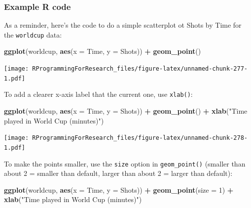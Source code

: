 \documentclass[]{book}
\makeatletter
\newenvironment{Shaded}{\begin{snugshade}}{\end{snugshade}}
\newcommand{\KeywordTok}[1]{\textcolor[rgb]{0.13,0.29,0.53}{\textbf{#1}}}
\newcommand{\DataTypeTok}[1]{\textcolor[rgb]{0.13,0.29,0.53}{#1}}
\newcommand{\DecValTok}[1]{\textcolor[rgb]{0.00,0.00,0.81}{#1}}
\newcommand{\StringTok}[1]{\textcolor[rgb]{0.31,0.60,0.02}{#1}}
\newcommand{\OperatorTok}[1]{\textcolor[rgb]{0.81,0.36,0.00}{\textbf{#1}}}
\newcommand{\NormalTok}[1]{#1}
\newenvironment{kframe}{%
\medskip{}
\setlength{\fboxsep}{.8em}
 \def\at@end@of@kframe{}%
 \ifinner\ifhmode%
  \def\at@end@of@kframe{\end{minipage}}%
  \begin{minipage}{\columnwidth}%
 \fi\fi%
 \def\FrameCommand##1{\hskip\@totalleftmargin \hskip-\fboxsep
 \colorbox{shadecolor}{##1}\hskip-\fboxsep
     \hskip-\linewidth \hskip-\@totalleftmargin \hskip\columnwidth}%
 \MakeFramed {\advance\hsize-\width
   \@totalleftmargin\z@ \linewidth\hsize
   \@setminipage}}%
 {\par\unskip\endMakeFramed%
 \at@end@of@kframe}
\renewenvironment{Shaded}{\begin{kframe}}{\end{kframe}}
\theoremstyle{definition}
\theoremstyle{definition}
\theoremstyle{definition}
\theoremstyle{remark}
\makeatother
\begin{document}
\subsubsection{Example R code}\label{example-r-code-8}

As a reminder, here's the code to do a simple scatterplot ot Shots by
Time for the \texttt{worldcup} data:

\begin{Shaded}
\begin{Highlighting}[]
\KeywordTok{ggplot}\NormalTok{(worldcup, }\KeywordTok{aes}\NormalTok{(}\DataTypeTok{x =}\NormalTok{ Time, }\DataTypeTok{y =}\NormalTok{ Shots)) }\OperatorTok{+}
\StringTok{        }\KeywordTok{geom_point}\NormalTok{()}
\end{Highlighting}
\end{Shaded}

\texttt{[image: RProgrammingForResearch\_files/figure-latex/unnamed-chunk-277-1.pdf]}

To add a clearer x-axis label that the current one, use \texttt{xlab()}:

\begin{Shaded}
\begin{Highlighting}[]
\KeywordTok{ggplot}\NormalTok{(worldcup, }\KeywordTok{aes}\NormalTok{(}\DataTypeTok{x =}\NormalTok{ Time, }\DataTypeTok{y =}\NormalTok{ Shots)) }\OperatorTok{+}
\StringTok{        }\KeywordTok{geom_point}\NormalTok{() }\OperatorTok{+}\StringTok{ }
\StringTok{        }\KeywordTok{xlab}\NormalTok{(}\StringTok{"Time played in World Cup (minutes)"}\NormalTok{)}
\end{Highlighting}
\end{Shaded}

\texttt{[image: RProgrammingForResearch\_files/figure-latex/unnamed-chunk-278-1.pdf]}

To make the points smaller, use the \texttt{size} option in
\texttt{geom\_point()} (smaller than about 2 = smaller than default,
larger than about 2 = larger than default):

\begin{Shaded}
\begin{Highlighting}[]
\KeywordTok{ggplot}\NormalTok{(worldcup, }\KeywordTok{aes}\NormalTok{(}\DataTypeTok{x =}\NormalTok{ Time, }\DataTypeTok{y =}\NormalTok{ Shots)) }\OperatorTok{+}
\StringTok{        }\KeywordTok{geom_point}\NormalTok{(}\DataTypeTok{size =} \DecValTok{1}\NormalTok{)  }\OperatorTok{+}\StringTok{ }
\StringTok{        }\KeywordTok{xlab}\NormalTok{(}\StringTok{"Time played in World Cup (minutes)"}\NormalTok{)}
\end{Highlighting}
\end{Shaded}
\end{document}
